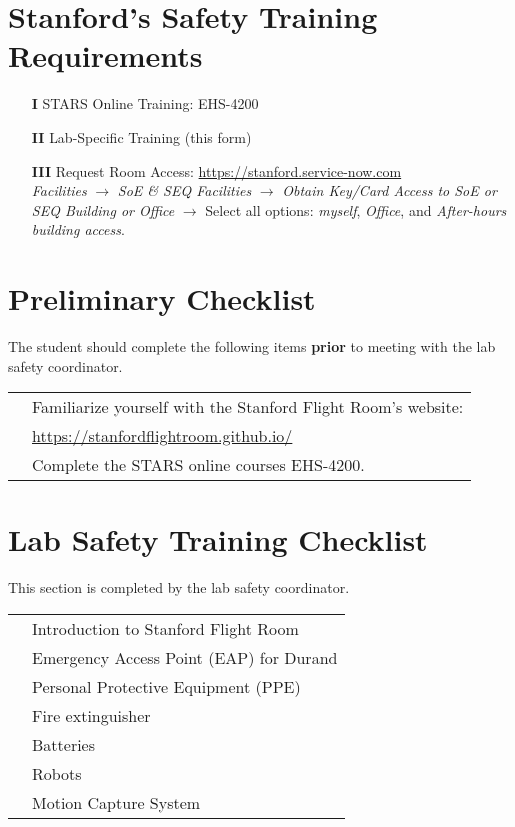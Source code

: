 \documentclass[letterpaper,11pt]{article}
\newcommand{\linespace}{\vspace{4mm}}		%
\newcommand{\red}[1]{\textcolor{stanford_red}{#1}}
\begin{document}
\section{\red{Stanford's Safety Training Requirements}}
\begin{enumerate}
	\item[\textbf{I}]{STARS Online Training: EHS-4200}
	\item[\textbf{II}]{Lab-Specific Training (this form)}
	\item[\textbf{III}]{Request Room Access: \url{https://stanford.service-now.com}\\
			 \textit{Facilities} $\rightarrow$ \textit{SoE \& SEQ Facilities} $\rightarrow$ \textit{Obtain Key/Card Access to SoE or SEQ Building or Office} $\rightarrow$ Select all options: \textit{myself}, \textit{Office}, and \textit{After-hours building access}. }
\end{enumerate}

\section{\red{Preliminary Checklist}}
\noindent
The student should complete the following items \textbf{prior} to meeting with the lab safety coordinator. 

\linespace\noindent
\begin{tabular}{ll}
	\CheckBox[name=preliminary1, width=1em] &Familiarize yourself with the Stanford Flight Room's website: \\
		& \url{https://stanfordflightroom.github.io/} \\
	\CheckBox[name=preliminary2, width=1em] & Complete the STARS online courses EHS-4200. \\
\end{tabular}

\section{\red{Lab Safety Training Checklist}}
\noindent
This section is completed by the lab safety coordinator. 

\linespace\noindent
\begin{tabular}{ll}
	\CheckBox[name=check1, width=1em] &Introduction to Stanford Flight Room\\
	\CheckBox[name=check2, width=1em] &Emergency Access Point (EAP) for Durand\\
	\CheckBox[name=check3, width=1em] &Personal Protective Equipment (PPE)\\
	\CheckBox[name=check4, width=1em] &Fire extinguisher\\
	\CheckBox[name=check5, width=1em] &Batteries\\
	\CheckBox[name=check6, width=1em] &Robots\\
	\CheckBox[name=check7, width=1em] &Motion Capture System\\
\end{tabular}
\end{document}
